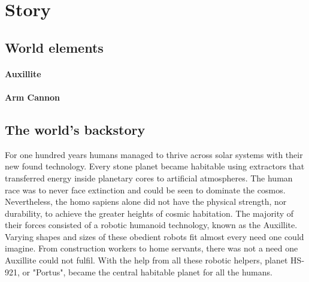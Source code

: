 \documentclass[../Main.tex]{subfiles}
\begin{document}
\section{Story}


\subsection{World elements}

\paragraph{Auxillite} 

\paragraph{Arm Cannon}

\subsection{The world's backstory}

For one hundred years humans managed to thrive across solar systems with their new found technology. Every stone planet became habitable using extractors that transferred energy inside planetary cores to artificial atmospheres. The human race was to never face extinction and could be seen to dominate the cosmos. Nevertheless, the homo sapiens alone did not have the physical strength, nor durability, to achieve the greater heights of cosmic habitation. The majority of their forces consisted of a robotic humanoid technology, known as the Auxillite. Varying shapes and sizes of these obedient robots fit almost every need one could imagine. From construction workers to home servants, there was not a need one Auxillite could not fulfil. With the help from all these robotic helpers, planet HS-921, or "Portus", became the central habitable planet for all the humans.
\end{document}
